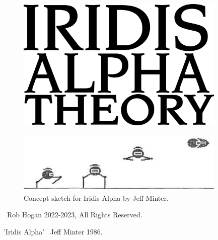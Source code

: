 
\vspace*{\fill}
\begin{figure}[H]
    \centering
      \includegraphics[width=10cm]{src/cover/title_page.png}%
\end{figure}
\vspace*{\fill}
\thispagestyle{empty}%

\clearpage
\vspace*{\fill}
\begin{figure}[H]
    \centering
      \includegraphics[width=10cm]{src/bumph/sketch.png}%
\caption*{Concept sketch for Iridis Alpha by Jeff Minter.}
\end{figure}

\vspace*{\fill}
\textcopyright\ Rob Hogan 2022-2023, All Rights Reserved.

'Iridis Alpha' \textcopyright\ Jeff Minter 1986.

\doclicenseThis
\thispagestyle{empty}%
\clearpage
